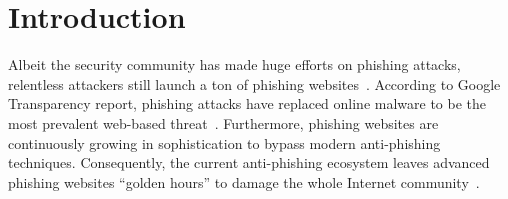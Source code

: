 \section{Introduction}
\label{s:intro}
Albeit the security community has made huge efforts on phishing attacks,
relentless attackers still launch a ton of phishing websites~\cite{ho2019detecting, van2019cognitive}.
According to Google Transparency report, phishing attacks have replaced online malware to be the most prevalent web-based threat~\cite{googletransparencyreport, solutions2019verizon}.
Furthermore, phishing websites are continuously growing in sophistication to bypass modern anti-phishing techniques.
Consequently, the current anti-phishing ecosystem leaves advanced phishing websites ``golden hours'' to damage the whole Internet community~\cite{oest2020sunrise}.

